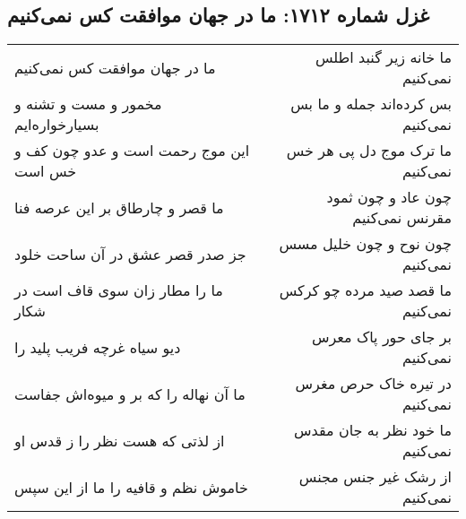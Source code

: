 \begin{center}
\section*{غزل شماره ۱۷۱۲: ما در جهان موافقت کس نمی‌کنیم}
\label{sec:1712}
\begin{longtable}{l p{0.5cm} r}
ما در جهان موافقت کس نمی‌کنیم
&&
ما خانه زیر گنبد اطلس نمی‌کنیم
\\
مخمور و مست و تشنه و بسیارخواره‌ایم
&&
بس کرده‌اند جمله و ما بس نمی‌کنیم
\\
این موج رحمت است و عدو چون کف و خس است
&&
ما ترک موج دل پی هر خس نمی‌کنیم
\\
ما قصر و چارطاق بر این عرصه فنا
&&
چون عاد و چون ثمود مقرنس نمی‌کنیم
\\
جز صدر قصر عشق در آن ساحت خلود
&&
چون نوح و چون خلیل مسس نمی‌کنیم
\\
ما را مطار زان سوی قاف است در شکار
&&
ما قصد صید مرده چو کرکس نمی‌کنیم
\\
دیو سیاه غرچه فریب پلید را
&&
بر جای حور پاک معرس نمی‌کنیم
\\
ما آن نهاله را که بر و میوه‌اش جفاست
&&
در تیره خاک حرص مغرس نمی‌کنیم
\\
از لذتی که هست نظر را ز قدس او
&&
ما خود نظر به جان مقدس نمی‌کنیم
\\
خاموش نظم و قافیه را ما از این سپس
&&
از رشک غیر جنس مجنس نمی‌کنیم
\\
\end{longtable}
\end{center}
